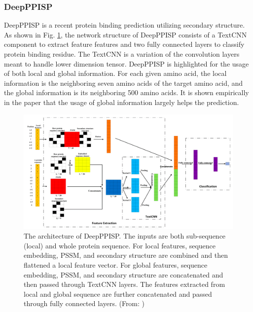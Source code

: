 \subsubsection{DeepPPISP}
DeepPPISP \cite{zeng2019protein} is a recent protein binding prediction utilizing secondary structure. As shown in Fig. \ref{fig_DeepPPISP}, the network structure of DeepPPISP consists of a TextCNN component to extract feature features and two fully connected layers to classify protein binding residue. The TextCNN is a variation of the convolution layers meant to handle lower dimension tensor. DeepPPISP is highlighted for the usage of both local and global information. For each given amino acid, the local information is the neighboring seven amino acids of the target amino acid, and the global information is its     neighboring 500 amino acids. It is shown empirically in the paper that the usage of global information largely helps the prediction. 
\begin{figure}[h!]
\begin{center}
\includegraphics[width = 14cm]{img/DeepPPISP.png}
\caption{The architecture of DeepPPISP. The inputs are both sub-sequence (local) and whole protein sequence. For local features, sequence embedding, PSSM, and secondary structure are combined and then flattened a local feature vector. For global features, sequence embedding, PSSM, and secondary structure are concatenated and then passed through TextCNN layers. The features extracted from local and global sequence are further concatenated and passed through fully connected layers.  (From: \cite{zeng2019protein})  \label{fig_DeepPPISP}}
\end{center}
\end{figure} 

